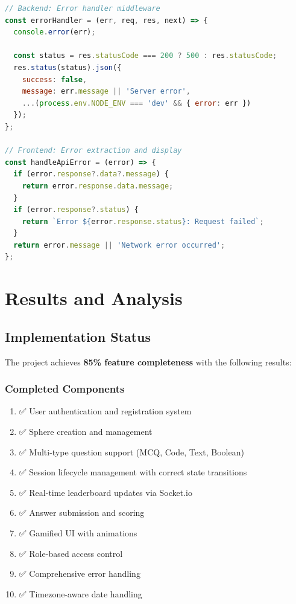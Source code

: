 \documentclass[12pt,a4paper]{report}
\newenvironment{reqbox}{%
  \begin{tcolorbox}[colback=lightgray,colframe=rulecol,
    leftrule=3pt,rightrule=0.4pt,toprule=0.4pt,bottomrule=0.4pt,
    arc=2pt,boxsep=2pt,left=4pt,right=4pt,top=3pt,bottom=3pt,breakable]
}{\end{tcolorbox}}
\begin{document}
\begin{lstlisting}[language=JavaScript]
// Backend: Error handler middleware
const errorHandler = (err, req, res, next) => {
  console.error(err);
  
  const status = res.statusCode === 200 ? 500 : res.statusCode;
  res.status(status).json({
    success: false,
    message: err.message || 'Server error',
    ...(process.env.NODE_ENV === 'dev' && { error: err })
  });
};

// Frontend: Error extraction and display
const handleApiError = (error) => {
  if (error.response?.data?.message) {
    return error.response.data.message;
  }
  if (error.response?.status) {
    return `Error ${error.response.status}: Request failed`;
  }
  return error.message || 'Network error occurred';
};
\end{lstlisting}

\cleardoublepage


\chapter{Results and Analysis}

\section{Implementation Status}

The project achieves \textbf{85\% feature completeness} with the following results:

\subsection{Completed Components}

\begin{reqbox}
  \begin{enumerate}[left=0pt]
    \item ✅ User authentication and registration system
    \item ✅ Sphere creation and management
    \item ✅ Multi-type question support (MCQ, Code, Text, Boolean)
    \item ✅ Session lifecycle management with correct state transitions
    \item ✅ Real-time leaderboard updates via Socket.io
    \item ✅ Answer submission and scoring
    \item ✅ Gamified UI with animations
    \item ✅ Role-based access control
    \item ✅ Comprehensive error handling
    \item ✅ Timezone-aware date handling
  \end{enumerate}
\end{reqbox}
\end{document}
